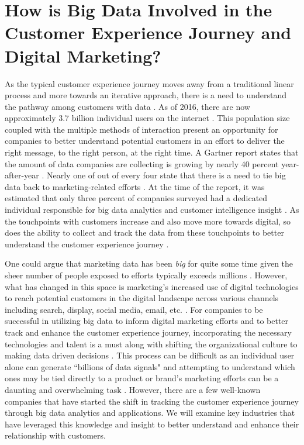 \documentclass[sigconf]{acmart}
\begin{document}
\section{How is Big Data Involved in the Customer Experience Journey and Digital Marketing?}
As the typical customer experience journey moves away from a traditional linear process and more towards an iterative approach, there is a need to understand the pathway among customers with data \cite{Edelman2010}. As of 2016, there are now approximately 3.7 billion individual users on the internet \cite{Akter2016}. This population size coupled with the multiple methods of interaction present an opportunity for companies to better understand potential customers in an effort to deliver the right message, to the right person, at the right time. A Gartner report states that the amount of data companies are collecting is growing by nearly 40 percent year-after-year \cite{Liyakasa2013}. Nearly one of out of every four state that there is a need to tie big data back to marketing-related efforts \cite{Liyakasa2013}. At the time of the report, it was estimated that only three percent of companies surveyed had a dedicated individual responsible for big data analytics and customer intelligence insight \cite{Liyakasa2013}. As the touchpoints with customers increase and also move more towards digital, so does the ability to collect and track the data from these touchpoints to better understand the customer experience journey \cite{Edelman2010}. 
\par 
One could argue that marketing data has been \textit{big} for quite some time given the sheer number of people exposed to efforts typically exceeds millions \cite{Couldry2014}. However, what has changed in this space is marketing's increased use of digital technologies to reach potential customers in the digital landscape across various channels including search, display, social media, email, etc. \cite{Kannan2017}. For companies to be successful in utilizing big data to inform digital marketing efforts and to better track and enhance the customer experience journey, incorporating the necessary technologies and talent is a must along with shifting the organizational culture to making data driven decisions \cite{Grishikashvili2014}. This process can be difficult as an individual user alone can generate ``billions of data signals" and attempting to understand which ones may be tied directly to a product or brand's marketing efforts can be a daunting and overwhelming task \cite{Couldry2014}. However, there are a few well-known companies that have started the shift in tracking the customer experience journey through big data analytics and applications. We will examine key industries that have leveraged this knowledge and insight to better understand and enhance their relationship with customers. 
\end{document}
